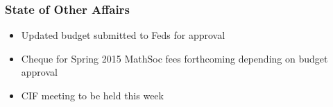 
\subsubsection*{State of Other Affairs}
\begin{itemize}
	\item Updated budget submitted to Feds for approval
	\item Cheque for Spring 2015 MathSoc fees forthcoming depending on budget approval
	\item CIF meeting to be held this week 
\end{itemize}

